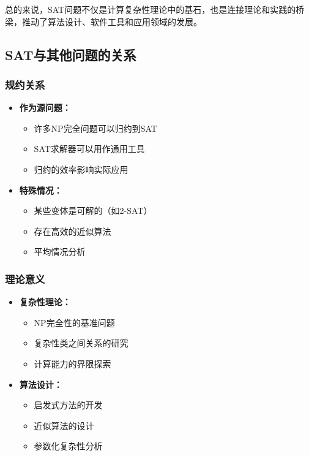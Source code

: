 \documentclass[a4paper,12pt]{ctexart}
\begin{document}
总的来说，SAT问题不仅是计算复杂性理论中的基石，也是连接理论和实践的桥梁，推动了算法设计、软件工具和应用领域的发展。

\subsection{SAT与其他问题的关系}
\subsubsection{规约关系}
\begin{itemize}
    \item \textbf{作为源问题：}
        \begin{itemize}
            \item 许多NP完全问题可以归约到SAT
            \item SAT求解器可以用作通用工具
            \item 归约的效率影响实际应用
        \end{itemize}
    \item \textbf{特殊情况：}
        \begin{itemize}
            \item 某些变体是可解的（如2-SAT）
            \item 存在高效的近似算法
            \item 平均情况分析
        \end{itemize}
\end{itemize}

\subsubsection{理论意义}
\begin{itemize}
    \item \textbf{复杂性理论：}
        \begin{itemize}
            \item NP完全性的基准问题
            \item 复杂性类之间关系的研究
            \item 计算能力的界限探索
        \end{itemize}
    \item \textbf{算法设计：}
        \begin{itemize}
            \item 启发式方法的开发
            \item 近似算法的设计
            \item 参数化复杂性分析
        \end{itemize}
\end{itemize}
\end{document}
